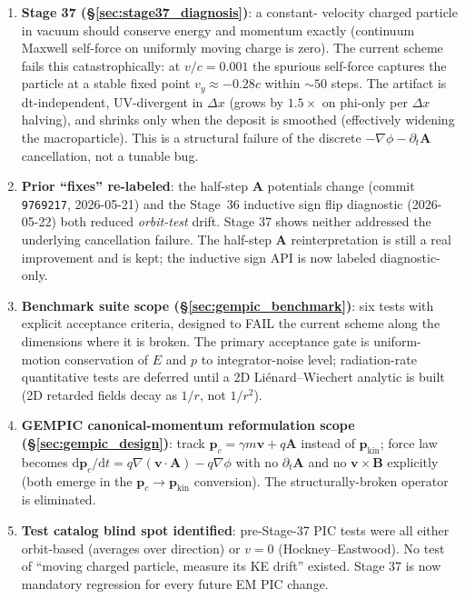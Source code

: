 \documentclass[11pt,a4paper]{article}
\newcommand{\vv}[1]{\mathbf{#1}}
\newcommand{\dd}{\mathrm{d}}
\begin{document}
\begin{enumerate}
  \item \textbf{Stage 37 (§\ref{sec:stage37_diagnosis})}: a constant-
    velocity charged particle in vacuum should conserve energy and
    momentum exactly (continuum Maxwell self-force on uniformly moving
    charge is zero).  The current scheme fails this catastrophically:
    at $v/c=0.001$ the spurious self-force captures the particle at a
    stable fixed point $v_y \approx -0.28c$ within $\sim 50$ steps.
    The artifact is dt-independent, UV-divergent in $\Delta x$ (grows
    by $1.5\times$ on phi-only per $\Delta x$ halving), and shrinks
    only when the deposit is smoothed (effectively widening the
    macroparticle).  This is a structural failure of the discrete
    $-\nabla\phi - \partial_t\vv{A}$ cancellation, not a tunable bug.
  \item \textbf{Prior ``fixes'' re-labeled}: the half-step $\vv{A}$
    potentials change (commit \texttt{9769217}, 2026-05-21) and the
    Stage~36 inductive sign flip diagnostic (2026-05-22) both reduced
    \emph{orbit-test} drift.  Stage 37 shows neither addressed the
    underlying cancellation failure.  The half-step $\vv{A}$
    reinterpretation is still a real improvement and is kept; the
    inductive sign API is now labeled diagnostic-only.
  \item \textbf{Benchmark suite scope (§\ref{sec:gempic_benchmark})}:
    six tests with explicit acceptance criteria, designed to FAIL the
    current scheme along the dimensions where it is broken.  The
    primary acceptance gate is uniform-motion conservation of $E$ and
    $p$ to integrator-noise level; radiation-rate quantitative tests
    are deferred until a 2D Liénard--Wiechert analytic is built (2D
    retarded fields decay as $1/r$, not $1/r^2$).
  \item \textbf{GEMPIC canonical-momentum reformulation scope
    (§\ref{sec:gempic_design})}: track $\vv{p}_c = \gamma m \vv{v} + q\vv{A}$
    instead of $\vv{p}_{\mathrm{kin}}$; force law becomes
    $\dd \vv{p}_c / \dd t = q\nabla(\vv{v}\cdot\vv{A}) - q\nabla\phi$
    with no $\partial_t \vv{A}$ and no $\vv{v}\times\vv{B}$ explicitly
    (both emerge in the $\vv{p}_c \to \vv{p}_{\mathrm{kin}}$
    conversion).  The structurally-broken operator is eliminated.
  \item \textbf{Test catalog blind spot identified}: pre-Stage-37 PIC
    tests were all either orbit-based (averages over direction) or
    $v=0$ (Hockney--Eastwood).  No test of ``moving charged particle,
    measure its KE drift'' existed.  Stage 37 is now mandatory
    regression for every future EM PIC change.
\end{enumerate}
\end{document}
